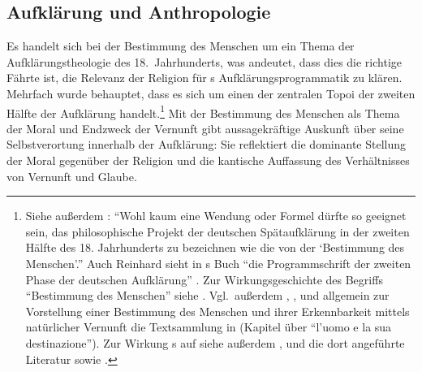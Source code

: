 \subsection{Aufklärung und
Anthropologie}\label{subsection:AufklaerungundAnthropologie} Es handelt sich bei
der Bestimmung des Menschen um ein Thema der Aufklärungstheologie des 18.~Jahrhunderts, was andeutet, dass dies die richtige Fährte ist, die Relevanz
der Religion für s Aufklärungsprogrammatik zu klären. Mehrfach wurde
behauptet, dass es sich um einen der zentralen Topoi der zweiten Hälfte der
Aufklärung
handelt.\footnote{ Siehe außerdem
\cite[][476]{Zoeller:DieBestimmungderBestimmungdesMenschenbeiMendelssohnundKant2001}:
\enquote{Wohl kaum eine Wendung oder Formel dürfte so geeignet sein, das
philosophische Projekt der deutschen Spätaufklärung in der zweiten Hälfte des
18. Jahrhunderts zu bezeichnen wie die von der \enquote{Bestimmung des
Menschen}.} Auch Reinhard  sieht in
s Buch
\enquote{die Programmschrift der zweiten Phase der deutschen Aufklärung}
\parencite[][61]{Brandt:DieBestimmungdesMenschenbeiKant2007}. Zur
Wirkungsgeschichte des Begriffs \enquote{Bestimmung des Menschen} siehe
\cite{DAlessandro:DieWiederkehreinesLeitworts1999}.
Vgl.\ außerdem \cite{Hinske:EineantikeKatechismusfrage1999},
\cite[][179--211]{Tippmann:DieBestimmungdesMenschenbeiJohannJoachimSpalding2011},
und allgemein zur Vorstellung einer Bestimmung des Menschen und ihrer
Erkennbarkeit mittels natürlicher Vernunft die Textsammlung in
\cite[][47--103]{Ciafardone:LIlluminismotedesco1983} (Kapitel über
\enquote{l'uomo e la sua destinazione}).
 Zur Wirkung
s
auf  siehe außerdem
 \cite[][189--198]{Tippmann:DieBestimmungdesMenschenbeiJohannJoachimSpalding2011},
 und die dort angeführte Literatur sowie
 \cite[][7--138]{Brandt:DieBestimmungdesMenschenbeiKant2007}.}
Mit der Bestimmung des Menschen als Thema der Moral und Endzweck der Vernunft
gibt  aussagekräftige Auskunft über seine Selbstverortung innerhalb
der Aufklärung: Sie reflektiert die dominante Stellung der Moral
gegenüber der Religion und die kantische Auffassung des
Verhältnisses von Vernunft und Glaube.


